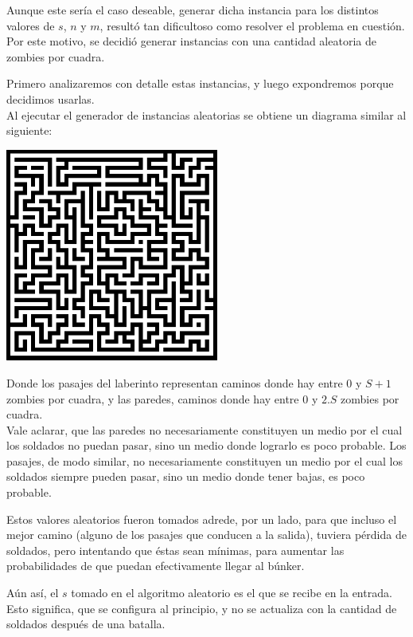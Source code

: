 Aunque este ser\'ia el caso deseable, generar dicha instancia para los distintos valores de $s$, $n$ y $m$, resultó tan dificultoso como resolver el problema en cuestión. Por este motivo, se decidi\'o generar instancias con una cantidad aleatoria de zombies por cuadra.

Primero analizaremos con detalle estas instancias, y luego expondremos porque decidimos usarlas.\\


Al ejecutar el generador de instancias aleatorias se obtiene un diagrama similar al siguiente:

\begin{center}
\includegraphics[width=7cm,keepaspectratio=yes]{imagenes/ej2/maze.png}
\end{center}

Donde los pasajes del laberinto representan caminos donde hay entre $0$ y $S+1$ zombies por cuadra, y las paredes, caminos donde hay entre $0$ y $2.S$ zombies por cuadra.\\

Vale aclarar, que las paredes no necesariamente constituyen un medio por el cual los soldados no puedan pasar, sino un medio donde lograrlo es poco probable. Los pasajes, de modo similar, no necesariamente constituyen un medio por el cual los soldados siempre pueden pasar, sino un medio donde tener bajas, es poco probable.

Estos valores aleatorios fueron tomados adrede, por un lado, para que incluso el mejor camino (alguno de los pasajes que conducen a la salida), tuviera p\'erdida de soldados, pero intentando que éstas sean mínimas, para aumentar las probabilidades de que puedan efectivamente llegar al búnker.\\
\bigskip

Aún as\'i, el $s$ tomado en el algoritmo aleatorio es el que se recibe en la entrada. Esto significa, que se configura al principio, y no se actualiza con la cantidad de soldados despu\'es de una batalla.

